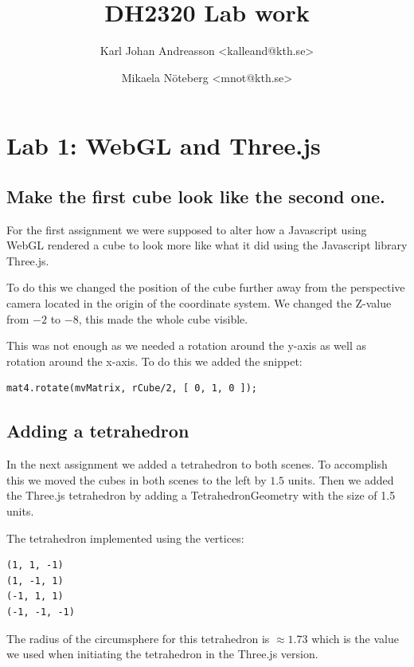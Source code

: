 \documentclass[a4paper]{article}
\title{DH2320 Lab work}
\author{Karl Johan Andreasson <{kalleand@kth.se}> %
\and Mikaela N\"oteberg <{mnot@kth.se}>
}
\begin{document}
\thispagestyle{empty}
\maketitle
\thispagestyle{empty}
\pagestyle{empty}
\newpage
\pagestyle{fancy}
\setcounter{page}{1}

\section{Lab 1: WebGL and Three.js}
\subsection{Make the first cube look like the second one.}

For the first assignment we were supposed to alter how a Javascript using WebGL rendered a
cube to look more like what it did using the Javascript library Three.js.

To do this we changed the position of the cube further away from the perspective
camera located in the origin of the coordinate system. We changed the Z-value
from $-2$ to $-8$, this made the whole cube visible.

This was not enough as we needed a rotation around the y-axis as well as
rotation around the x-axis. To do this we added the snippet:

\begin{verbatim}
mat4.rotate(mvMatrix, rCube/2, [ 0, 1, 0 ]);
\end{verbatim}

\subsection{Adding a tetrahedron}

In the next assignment we added a tetrahedron to both scenes. To accomplish this
we moved the cubes in both scenes to the left by $1.5$ units. Then we added the
Three.js tetrahedron by adding a TetrahedronGeometry with the size of 1.5 units.

The tetrahedron implemented using the vertices:

\begin{verbatim}
(1, 1, -1)
(1, -1, 1)
(-1, 1, 1)
(-1, -1, -1)
\end{verbatim}

The radius of the circumsphere for this tetrahedron is $\approx 1.73$ which is
the value we used when initiating the tetrahedron in the Three.js version.
\end{document}

